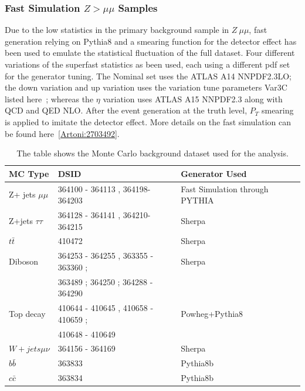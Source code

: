 \subsubsection{Fast Simulation $Z > \mu\mu$  Samples}
\label{sec:fastsimulation}
Due to the low statistics in the primary background sample in  $Z \> \mu \mu$, fast generation relying on Pythia8 and a smearing function for the detector effect has been used to emulate the statistical fluctuation of the full dataset. Four different variations of the superfast statistics as been used, each using a different pdf set for the generator tuning. The Nominal set uses the ATLAS A14 NNPDF2.3LO; the down variation and up variation uses the variation tune parameters Var3C listed
here~\cite{ATL-PHYS-PUB-2014-021}; whereas the $\eta$ variation uses ATLAS A15 NNPDF2.3 along with QCD and QED NLO. After the event generation at the truth level, $P_{T}$ smearing is applied to imitate the detector effect. More details on the fast simulation can be found here~\ref{Artoni:2703492}.

\begin{table}[!htb]
    \begin{center}
    \caption{
        The table shows the Monte Carlo background dataset used for the analysis. 
    \label{table:MC}
    }
\label{tab:MC samples}
\begin{tabular}{|l|l|l|}
\hline
\textbf{MC Type}   & \textbf{DSID}                                                         &\textbf{Generator Used}\\ \hline
Z+ jets $\mu\mu$   & 364100 - 364113 , 364198-364203                                       &Fast Simulation through PYTHIA\\ \hline
Z+jets $\tau \tau$ & 364128 - 364141 , 364210-364215                                       &Sherpa\\ \hline
$t\bar{t}$         & 410472                                                                &Sherpa\\ \hline
Diboson            & 364253 - 364255 , 363355 - 363360 ; &Sherpa \\
& 363489 ; 364250 ; 364288 - 364290 & \\ \hline
Top decay          & 410644 - 410645 , 410658 - 410659 ;                   &Powheg+Pythia8\\ 
&410648 - 410649 & \\ \hline
$W + jets \mu\nu$  & 364156 - 364169                                                       &Sherpa\\ \hline
$b\bar{b}$         & 363833                                                                &Pythia8b\\ \hline
$c\bar{c}$         & 363834                                                                &Pythia8b\\ \hline
\end{tabular}
\end{center}
\end{table}

